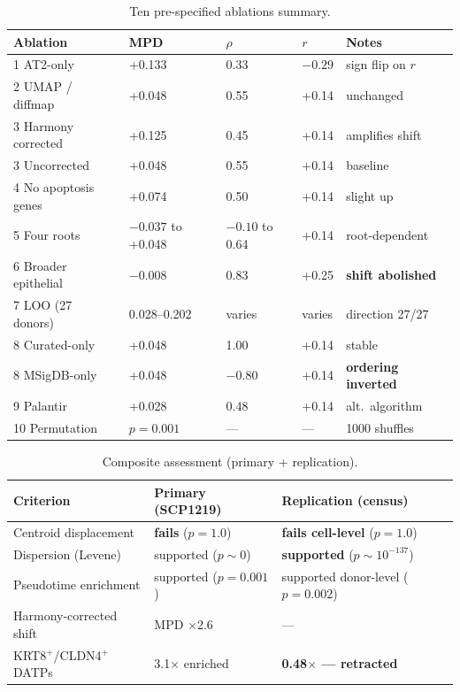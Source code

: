 \documentclass[11pt,a4paper]{article}
\begin{document}
\begin{table}[htbp]
\centering
\caption{Ten pre-specified ablations summary.}
\label{tab:ablations}
\small
\begin{tabular}{llllp{4cm}}
\toprule
Ablation & MPD & $\rho$ & $r$ & Notes \\
\midrule
1 AT2-only & +0.133 & 0.33 & $-0.29$ & sign flip on $r$ \\
2 UMAP / diffmap & +0.048 & 0.55 & +0.14 & unchanged \\
3 Harmony corrected & +0.125 & 0.45 & +0.14 & amplifies shift \\
3 Uncorrected & +0.048 & 0.55 & +0.14 & baseline \\
4 No apoptosis genes & +0.074 & 0.50 & +0.14 & slight up \\
5 Four roots & $-0.037$ to +0.048 & $-0.10$ to 0.64 & +0.14 & root-dependent \\
6 Broader epithelial & $-0.008$ & 0.83 & +0.25 & \textbf{shift abolished} \\
7 LOO (27 donors) & 0.028--0.202 & varies & varies & direction 27/27 \\
8 Curated-only & +0.048 & 1.00 & +0.14 & stable \\
8 MSigDB-only & +0.048 & $-0.80$ & +0.14 & \textbf{ordering inverted} \\
9 Palantir & +0.028 & 0.48 & +0.14 & alt.\ algorithm \\
10 Permutation & $p=0.001$ & --- & --- & 1000 shuffles \\
\bottomrule
\end{tabular}
\end{table}

\begin{table}[htbp]
\centering
\caption{Composite assessment (primary + replication).}
\label{tab:composite}
\begin{tabular}{lll}
\toprule
Criterion & Primary (SCP1219) & Replication (census) \\
\midrule
Centroid displacement & \textbf{fails} ($p=1.0$) & \textbf{fails cell-level} ($p=1.0$) \\
Dispersion (Levene) & supported ($p \sim 0$) & \textbf{supported} ($p \sim 10^{-137}$) \\
Pseudotime enrichment & supported ($p=0.001$) & supported donor-level ($p=0.002$) \\
Harmony-corrected shift & MPD $\times$2.6 & --- \\
KRT8$^+$/CLDN4$^+$ DATPs & 3.1$\times$ enriched & \textbf{0.48$\times$ --- retracted} \\
\bottomrule
\end{tabular}
\end{table}
\end{document}
